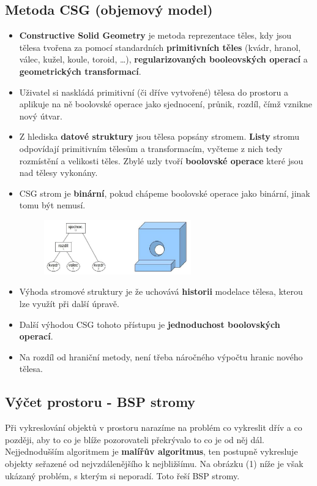  \subsection{Metoda CSG (objemový model)}
 \begin{itemize}
 	\item \textbf{Constructive Solid Geometry} je metoda reprezentace těles, kdy jsou tělesa tvořena za pomocí standardních \textbf{primitivních těles} (kvádr, hranol, válec, kužel, koule, toroid, …), \textbf{regularizovaných booleovských operací} a \textbf{geometrických transformací}.
	\item Uživatel si naskládá primitivní (či dříve vytvořené) tělesa do prostoru a aplikuje na ně boolovské operace jako sjednocení, průnik, rozdíl, čímž vznikne nový útvar.
	\item Z hlediska \textbf{datové struktury} jsou tělesa popsány stromem. \textbf{Listy} stromu odpovídají primitivním tělesům a transformacím, vyčteme z nich tedy rozmístění a velikosti těles. Zbylé uzly tvoří \textbf{boolovské operace} které jsou nad tělesy vykonány.
	\item CSG strom je \textbf{binární}, pokud chápeme boolovské operace jako binární, jinak tomu být nemusí.
		\begin{figure}[H]
		\centering
		\includegraphics[width=0.6\textwidth]{assets/4_csg}
		\end{figure}
 	\item Výhoda stromové struktury je že uchovává \textbf{historii} modelace tělesa, kterou lze využít při další úpravě.
 	\item Další výhodou CSG tohoto přístupu je \textbf{jednoduchost boolovských operací}.
 	\item Na rozdíl od hraniční metody, není třeba náročného výpočtu hranic nového tělesa.
 \end{itemize}

 \subsection{Výčet prostoru - BSP stromy}
 Při vykreslování objektů v prostoru narazíme na problém co vykreslit dřív a co později, aby to co je blíže pozorovateli překrývalo to co je od něj dál. Nejjednodušším algoritmem je \textbf{malířův algoritmus}, ten postupně vykresluje objekty seřazené od nejvzdálenějšího k nejbližšímu. Na obrázku (1) níže je však ukázaný problém, s kterým si neporadí. Toto řeší BSP stromy.
 
